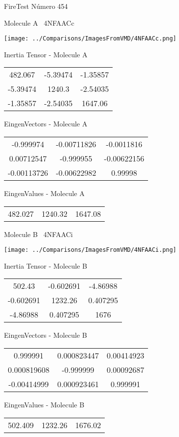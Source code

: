 \vtab[-3cm]
\begin{center}
{\large FireTest \tab Número 454}
\end{center}
\begin{multicols}{2}
\begin{center}

Molecule A \
4NFAACc

\texttt{[image: ../Comparisons/ImagesFromVMD/4NFAACc.png]}

Inertia Tensor - Molecule A \\
\begin{tabular}{|c c c|}
482.067	 & 	-5.39474	 & 	-1.35857	 \\
-5.39474	 & 	1240.3	 & 	-2.54035	 \\
-1.35857	 & 	-2.54035	 & 	1647.06
\end{tabular}

\vtab
 EingenVectors - Molecule A     \\
\begin{tabular}{|c c c|}
-0.999974	 & 	-0.00711826	 & 	-0.0011816	 \\
0.00712547	 & 	-0.999955	 & 	-0.00622156	 \\
-0.00113726	 & 	-0.00622982	 & 	0.99998
\end{tabular}

\vtab
 EingenValues - Molecule A     \\
\begin{tabular}{|c c c|}
482.027	 & 	1240.32	 & 	1647.08	 \\
\end{tabular}
\columnbreak

Molecule B \
4NFAACi

\texttt{[image: ../Comparisons/ImagesFromVMD/4NFAACi.png]}

Inertia Tensor - Molecule B \\
\begin{tabular}{|c c c|}
502.43	 & 	-0.602691	 & 	-4.86988	 \\
-0.602691	 & 	1232.26	 & 	0.407295	 \\
-4.86988	 & 	0.407295	 & 	1676
\end{tabular}

\vtab
 EingenVectors - Molecule B     \\
\begin{tabular}{|c c c|}
0.999991	 & 	0.000823447	 & 	0.00414923	 \\
0.000819608	 & 	-0.999999	 & 	0.00092687	 \\
-0.00414999	 & 	0.000923461	 & 	0.999991
\end{tabular}

\vtab
 EingenValues - Molecule B     \\
\begin{tabular}{|c c c|}
502.409	 & 	1232.26	 & 	1676.02	 \\
\end{tabular}

\end{center}
\end{multicols}

